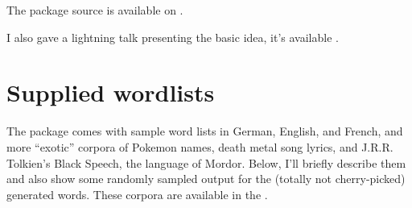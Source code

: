 \documentclass[letterpaper,10pt,english]{sphinxmanual}
\begin{document}
The package source is available on .

I also gave a lightning talk presenting the basic idea, it’s available .


\section{Supplied wordlists}
\label{\detokenize{introduction:supplied-wordlists}}
The package comes with sample word lists in German, English, and French, and
more “exotic” corpora of Pokemon names, death metal song lyrics, and
J.R.R. Tolkien’s Black Speech, the language of Mordor. Below, I’ll briefly
describe them and also show some randomly sampled output for the (totally not
cherry-picked) generated words. These corpora are available in the .
\end{document}
